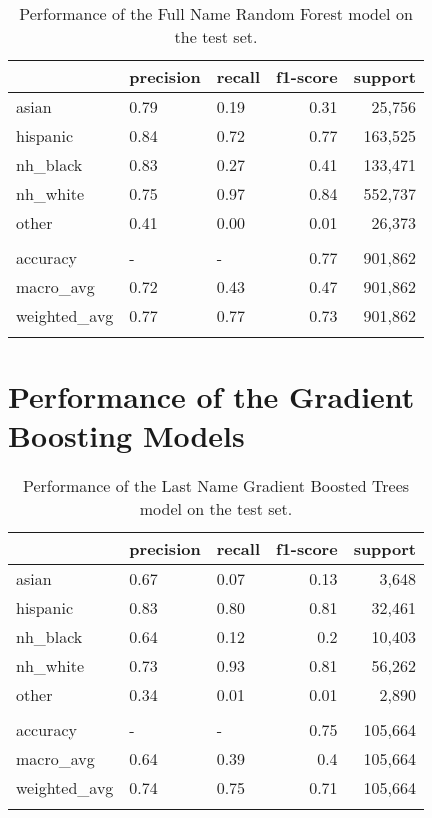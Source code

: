\documentclass[12pt, letterpaper]{article}
\begin{document}
\begin{table}[h!]
\centering
\caption{Performance of the Full Name Random Forest model on the test set.}
\begin{tabular}{lllrr}
\hline
              & precision   & recall   &   f1-score &   support \\
\hline
 asian        & 0.79        & 0.19     &       0.31 &     25,756 \\
 hispanic     & 0.84        & 0.72     &       0.77 &    163,525 \\
 nh\_black     & 0.83        & 0.27     &       0.41 &    133,471 \\
 nh\_white     & 0.75        & 0.97     &       0.84 &    552,737 \\
 other        & 0.41        & 0.00     &       0.01 &     26,373 \\
              &             &          &            &           \\
 accuracy     & -           & -        &       0.77 &    901,862 \\
 macro\_avg    & 0.72        & 0.43     &       0.47 &    901,862 \\
 weighted\_avg & 0.77        & 0.77     &       0.73 &    901,862 \\
\hline
\label{table:rf_full_name}
\end{tabular}
\end{table}

\clearpage
\section{Performance of the Gradient Boosting Models}\label{gbm_perf}

\begin{table}[h!]
\centering
\caption{Performance of the Last Name Gradient Boosted Trees model on the test set.}
\begin{tabular}{lllrr}
\hline
              & precision   & recall   &   f1-score &   support \\
\hline
 asian        & 0.67        & 0.07     &       0.13 &      3,648 \\
 hispanic     & 0.83        & 0.80     &       0.81 &     32,461 \\
 nh\_black     & 0.64        & 0.12     &       0.2  &     10,403 \\
 nh\_white     & 0.73        & 0.93     &       0.81 &     56,262 \\
 other        & 0.34        & 0.01     &       0.01 &      2,890 \\
              &             &          &            &           \\
 accuracy     & -           & -        &       0.75 &    105,664 \\
 macro\_avg    & 0.64        & 0.39     &       0.4  &    105,664 \\
 weighted\_avg & 0.74        & 0.75     &       0.71 &    105,664 \\
\hline
\label{table:gb_last_name}
\end{tabular}
\end{table}
\end{document}
